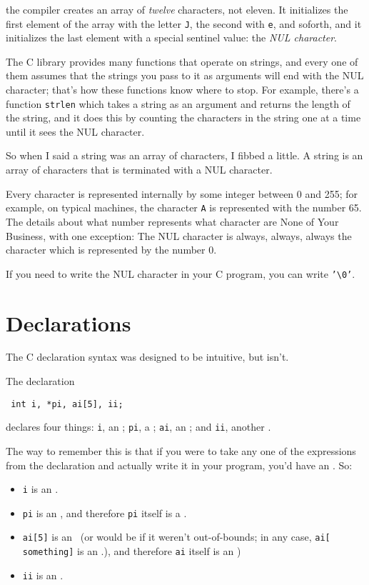 \noindent the compiler creates an array of {\em twelve}\/ characters,
not eleven.  It initializes the first element of the array with the
letter {\tt J}, the second with {\tt e}, and soforth, and it initializes
the last element with a special sentinel value: the {\em NUL character}.

The C library provides many functions that operate on strings, and every
one of them assumes that the strings you pass to it as arguments will
end with the NUL character; that's how these functions know where to
stop.  For example, there's a function {\tt strlen} which takes a string
as an argument and returns the length of the string, and it does this by
counting the characters in the string one at a time until it sees the
NUL character.

So when I said a string was an array of characters, I fibbed a little.
A string is an array of characters that is terminated with a NUL
character.

Every character is represented internally by some integer between 0 and
255; for example, on typical machines, the character {\tt A} is
represented with the number 65.  The details about what number
represents what character are None of Your Business, with one exception:
The NUL character is always, always, always the character which is
represented by the number 0.

If you need to write the NUL character in your C program, you can write
{\tt '\verb+\+0'}.  

\section{Declarations}

The C declaration syntax was designed to be intuitive, but isn't.  

The declaration 


\begin{flushleft}
\verb! int i, *pi, ai[5], ii; !
\end{flushleft}

\noindent declares four things:  {\tt i}, an \int; {\tt pi}, a \Int;
{\tt ai}, an \Int; and {\tt ii}, another \int.

The way to remember this is that if you were to take any one of
the expressions from the declaration and actually write it in your
program, you'd have an \int.  So:  
\begin{itemize}
\item {\tt i} is an \int. 
\item  {\tt *pi} is an
\int, and therefore {\tt pi} itself is a \Int. 
\item {\tt ai[5]} is an
\int\ (or would be if it weren't out-of-bounds; in any case, {\tt ai[{\rm
something}]} is an \int.), and therefore {\tt ai} itself is an \ao\Int)
\item {\tt ii} is an \int. 
\end{itemize}

